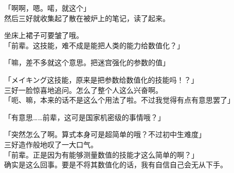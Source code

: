 「啊啊，嗯。喏，就这个」\\

然后三好就收集起了散在被炉上的笔记，读了起来。

坐床上裙子可要皱了哦。\\

「前辈。这技能，难不成是能把人类的能力给数值化？」

「嘛，差不多就这个意思。把迷宫强化的参数的值」

「メイキング这技能，原来是把参数给数值化的技能吗！？」\\

三好一脸惊喜地追问。怎么了整个人这么兴奋啊。\\

「呃、嘛，本来的话不是这么个用法了啦。不过我觉得有点有意思罢了」

「有意思……前辈，这可是国家机密级的事情哦？」

「突然怎么了啊。算式本身可是超简单的哦？不过初中生难度」\\

三好造作般地叹了一大口气。\\

「前辈。正是因为有能够测量数值的技能才这么简单的啊？」\\

确实是这么回事。要是不将其数值化的话，我有自信自己会无从下手。\\

